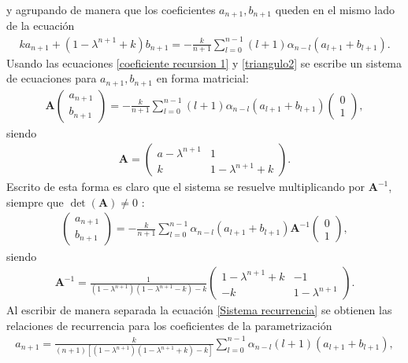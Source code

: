 y agrupando de manera que los coeficientes $a_{n+1},b_{n+1}$ queden en el mismo lado de la ecuación
\begin{eqnarray}
k a_{n+1}+(1-\lambda^{n+1}+k)b_{n+1}=-\frac{k}{n+1}\sum_{l=0}^{n-1}(l+1)\alpha_{n-l}
(a_{l+1}+b_{l+1}).
\label{triangulo2}
\end{eqnarray}
Usando las ecuaciones \eqref{coeficiente recursion 1} y \eqref{triangulo2} se escribe un sistema de ecuaciones para $a_{n+1},b_{n+1}$ en forma matricial:
\begin{eqnarray}
\mathbf{A}\begin{pmatrix}
a_{n+1}\\
b_{n+1}
\end{pmatrix}=-\frac{k}{n+1}\sum_{l=0}^{n-1}(l+1)\alpha_{n-l}(a_{l+1}+b_{l+1})\begin{pmatrix}
0\\
1
\end{pmatrix},
\label{sistema recurrencia}
\end{eqnarray}
siendo 
\begin{eqnarray}
\mathbf{A}=\begin{pmatrix}
a-\lambda^{n+1} & 1 \\
k & 1-\lambda^{n+1}+k
\end{pmatrix}.
\end{eqnarray}
Escrito de esta forma es claro que el sistema se resuelve multiplicando por $\mathbf{A}^{-1}$, siempre que $\det(\mathbf{A})\neq 0$ :
\begin{eqnarray}
\begin{pmatrix}
a_{n+1}\\
b_{n+1}
\end{pmatrix}=-\frac{k}{n+1}\sum_{l=0}^{n-1}\alpha_{n-l}(a_{l+1}+b_{l+1})\mathbf{A}^{-1}\begin{pmatrix}
0\\
1
\end{pmatrix},
\label{Sistema recurrencia}
\end{eqnarray}
siendo
\begin{eqnarray}
\mathbf{A}^{-1}=\frac{1}{(1-\lambda^{n+1})(1-\lambda^{n+1}-k)-k}\begin{pmatrix}
1-\lambda^{n+1}+k & -1\\
-k & 1-\lambda^{n+1}
\end{pmatrix}.
\end{eqnarray}
Al escribir de manera separada la ecuación \eqref{Sistema recurrencia} se obtienen las relaciones de recurrencia para los coeficientes de la parametrización
\begin{eqnarray}
a_{n+1}=\frac{k}{(n+1)[(1-\lambda^{n+1})(1-\lambda^{n+1}+k)-k]}\sum_{l=0}^{n-1}\alpha_{n-l}(l+1)(a_{l+1}+b_{l+1}),
\end{eqnarray}
